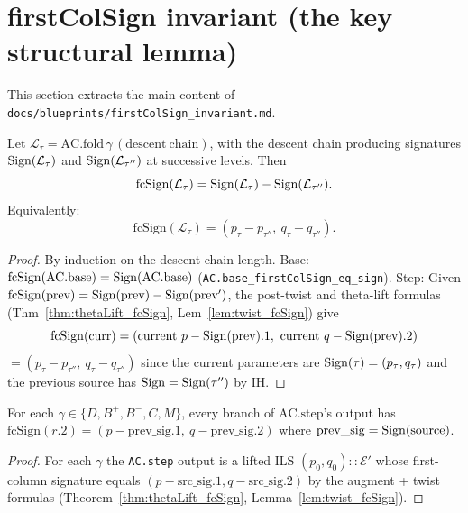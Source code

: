 \section{firstColSign invariant (the key structural lemma)}

This section extracts the main content of
\texttt{docs/blueprints/firstColSign\_invariant.md}.

\begin{theorem}
  \label{thm:fcSign_diff}
  \leanok
  Let $\mathcal{L}_\tau = \mathrm{AC.fold}\,\gamma\,(\mathrm{descent\ chain})$, with
  the descent chain producing signatures $\mathrm{Sign}(\mathcal{L}_\tau)$ and
  $\mathrm{Sign}(\mathcal{L}_{\tau''})$ at successive levels. Then
  \[ \mathrm{fcSign}(\mathcal{L}_\tau) = \mathrm{Sign}(\mathcal{L}_\tau) - \mathrm{Sign}(\mathcal{L}_{\tau''}). \]
  Equivalently:
  \[ \mathrm{fcSign}(\mathcal{L}_\tau) = (p_\tau - p_{\tau''},\ q_\tau - q_{\tau''}). \]
\end{theorem}

\begin{proof}
  \leanok
  By induction on the descent chain length. Base: $\mathrm{fcSign}(\mathrm{AC.base}) = \mathrm{Sign}(\mathrm{AC.base})$ (\texttt{AC.base\_firstColSign\_eq\_sign}).
  Step: Given $\mathrm{fcSign}(\text{prev}) = \mathrm{Sign}(\text{prev}) - \mathrm{Sign}(\text{prev}')$, the post-twist and theta-lift formulas (Thm~\ref{thm:thetaLift_fcSign}, Lem~\ref{lem:twist_fcSign}) give
  \[ \mathrm{fcSign}(\text{curr}) = (\text{current } p - \mathrm{Sign}(\text{prev}).1,\ \text{current } q - \mathrm{Sign}(\text{prev}).2) \]
  $= (p_\tau - p_{\tau''},\ q_\tau - q_{\tau''})$ since the current parameters are $\mathrm{Sign}(\tau) = (p_\tau, q_\tau)$ and the previous source has $\mathrm{Sign} = \mathrm{Sign}(\tau'')$ by IH.
\end{proof}

\begin{theorem}
  \label{thm:AC_step_fcSign}
  \leanok
  For each $\gamma \in \{D, B^+, B^-, C, M\}$, every branch of $\mathrm{AC.step}$'s output has
  $\mathrm{fcSign}(r.2) = (p - \mathrm{prev\_sig}.1,\ q - \mathrm{prev\_sig}.2)$ where $\mathrm{prev\_sig} = \mathrm{Sign}(\text{source})$.
\end{theorem}
\begin{proof}
  \leanok
  For each $\gamma$ the \texttt{AC.step} output is a lifted ILS $(p_0, q_0) :: \mathcal{E}'$ whose first-column signature equals $(p - \mathrm{src\_sig}.1, q - \mathrm{src\_sig}.2)$ by the augment + twist formulas (Theorem~\ref{thm:thetaLift_fcSign}, Lemma~\ref{lem:twist_fcSign}).
\end{proof}


